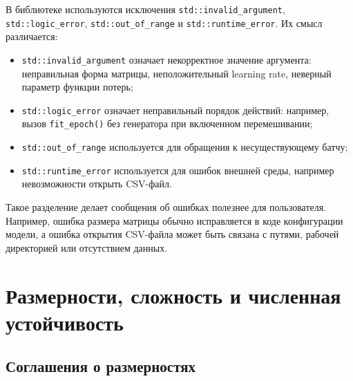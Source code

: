 \documentclass{article}
\begin{document}
В библиотеке используются исключения \texttt{std::invalid\_argument},
\texttt{std::logic\_error}, \texttt{std::out\_of\_range} и
\texttt{std::runtime\_error}. Их смысл различается:
\begin{itemize}
    \item \texttt{std::invalid\_argument} означает некорректное
        значение аргумента: неправильная форма матрицы,
        неположительный learning rate, неверный параметр функции
        потерь; \item \texttt{std::logic\_error} означает неправильный
        порядок действий: например, вызов \texttt{fit\_epoch()} без
        генератора при включенном перемешивании; \item
        \texttt{std::out\_of\_range} используется для обращения к
        несуществующему батчу; \item \texttt{std::runtime\_error}
        используется для ошибок внешней среды, например невозможности
        открыть CSV-файл.
\end{itemize}
Такое разделение делает сообщения об ошибках полезнее для
пользователя. Например, ошибка размера матрицы обычно исправляется в
коде конфигурации модели, а ошибка открытия CSV-файла может быть
связана с путями, рабочей директорией или отсутствием данных.

\section{Размерности, сложность и численная устойчивость}

\subsection{Соглашения о размерностях}
\end{document}
